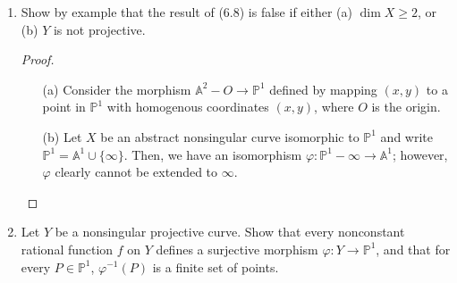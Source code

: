 \documentclass[12pt]{article}
\newcommand{\A}{\mathbb{A}}
\newcommand{\PP}{\mathbb{P}}
\theoremstyle{definition}
\begin{document}
\begin{enumerate} [label=\textbf{\arabic*.}, leftmargin=-0.05em]
\begin{proof}
\begin{itemize}
    Suppose $x = ab$ for some $a, b \in A$. Then, $x^2 = N(a) N(b)$ and $x$ is irreducible in $k[x]$, so either $N(a)$, $N(b)$ each are associates with $x$, or $N(a)$ is an associate of $x^2$ and $N(b)$ is a unit. It suffices to show $N$ is not onto $k[x]$, that is there does not exist $c \in A$ such that $N(c) = x$. By the formula above, the degree of $f^2$ is even while $(x^3 - x)g^2$ has degree $0$ or an odd number, so $f^2 - (x^3 - x)g^2$ must have degree greater than $1$. Therefore, $N(b)$ is a unit, hence $b$ is a unit. The case for $y$ follows similarly, since $N(y) = x(1 + x)(1 - x)$, so if $y = ab$, then either $N(a)$ is associates with $x$ or $x(1 + x)(1 - x)$, and the former case was shown to be impossible.
    
    $A$ is not a unique factorization domain since $y^2 = x(x + 1)(x - 1)$, and $x$, $y$ are irreducible and hence prime but are not associates since the only units in $A$ are the nonzero elements of $k$.
  \end{itemize}
\end{proof}

\item Show by example that the result of (6.8) is false if either (a) $\dim{X} \geq 2$, or (b) $Y$ is not projective.

\begin{proof} $ $ \vspace{0pt}
  \begin{itemize}
    \item[(a)] Consider the morphism $\A^2 - O \to \PP^1$ defined by mapping $(x, y)$ to a point in $\PP^1$ with homogenous coordinates $(x, y)$, where $O$ is the origin.

    \item[(b)] Let $X$ be an abstract nonsingular curve isomorphic to $\PP^1$ and write $\PP^1 = \A^1 \cup \{ \infty \}$. Then, we have an isomorphism $\varphi : \PP^1 - \infty \to \A^1$; however, $\varphi$ clearly cannot be extended to $\infty$.
  \end{itemize}
\end{proof}
\filbreak

\item Let $Y$ be a nonsingular projective curve. Show that every nonconstant rational function $f$ on $Y$ defines a surjective morphism $\varphi : Y \to \PP^1$, and that for every $P \in \PP^1$, $\varphi^{-1}(P)$ is a finite set of points.


\end{enumerate}
\end{document}
